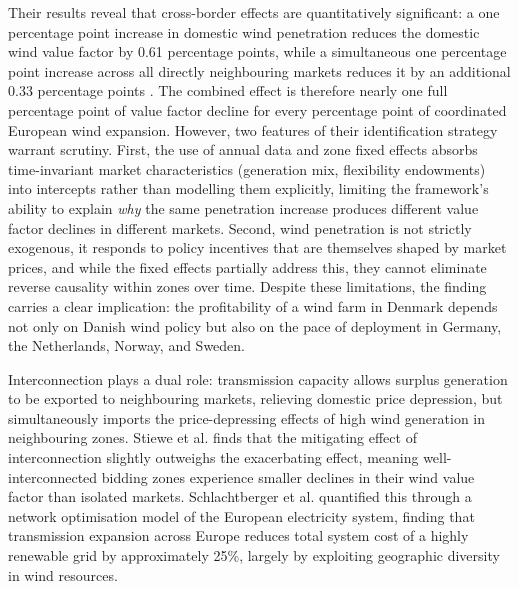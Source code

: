 Their results reveal that cross-border effects are quantitatively significant: a one percentage point increase in domestic wind penetration reduces the domestic wind value factor by 0.61 percentage points, while a simultaneous one percentage point increase across all directly neighbouring markets reduces it by an additional 0.33 percentage points \cite{Stiewe2025}. The combined effect is therefore nearly one full percentage point of value factor decline for every percentage point of coordinated European wind expansion. However, two features of their identification strategy warrant scrutiny. First, the use of annual data and zone fixed effects absorbs time-invariant market characteristics (generation mix, flexibility endowments) into intercepts rather than modelling them explicitly, limiting the framework's ability to explain \textit{why} the same penetration increase produces different value factor declines in different markets. Second, wind penetration is not strictly exogenous, it responds to policy incentives that are themselves shaped by market prices, and while the fixed effects partially address this, they cannot eliminate reverse causality within zones over time. Despite these limitations, the finding carries a clear implication: the profitability of a wind farm in Denmark depends not only on Danish wind policy but also on the pace of deployment in Germany, the Netherlands, Norway, and Sweden.

\vspace{4pt}

Interconnection plays a dual role: transmission capacity allows surplus generation to be exported to neighbouring markets, relieving domestic price depression, but simultaneously imports the price-depressing effects of high wind generation in neighbouring zones. Stiewe et al. \cite{Stiewe2025} finds that the mitigating effect of interconnection slightly outweighs the exacerbating effect, meaning well-interconnected bidding zones experience smaller declines in their wind value factor than isolated markets. Schlachtberger et al. \cite{Schlachtberger2017} quantified this through a network optimisation model of the European electricity system, finding that transmission expansion across Europe reduces total system cost of a highly renewable grid by approximately 25\%, largely by exploiting geographic diversity in wind resources.

\vspace{4pt}

